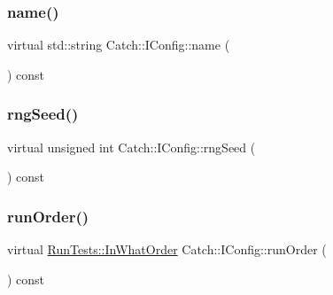 \mbox{\label{struct_catch_1_1_i_config_aa2315800a05c19db71518b1edc39d43b}} 
\subsubsection{\texorpdfstring{name()}{name()}}
{\footnotesize\ttfamily virtual std\+::string Catch\+::\+I\+Config\+::name (\begin{DoxyParamCaption}{ }\end{DoxyParamCaption}) const\hspace{0.3cm}{\ttfamily [pure virtual]}}

\mbox{\label{struct_catch_1_1_i_config_ae049eb45979d841073fa65d1094c7f14}} 
\subsubsection{\texorpdfstring{rng\+Seed()}{rngSeed()}}
{\footnotesize\ttfamily virtual unsigned int Catch\+::\+I\+Config\+::rng\+Seed (\begin{DoxyParamCaption}{ }\end{DoxyParamCaption}) const\hspace{0.3cm}{\ttfamily [pure virtual]}}

\mbox{\label{struct_catch_1_1_i_config_a0fc59c9aba1d4018538d5526daa5eb78}} 
\subsubsection{\texorpdfstring{run\+Order()}{runOrder()}}
{\footnotesize\ttfamily virtual \mbox{\hyperlink{struct_catch_1_1_run_tests_ab56bd851b1dd085869992d1a9d73dc5d}{Run\+Tests\+::\+In\+What\+Order}} Catch\+::\+I\+Config\+::run\+Order (\begin{DoxyParamCaption}{ }\end{DoxyParamCaption}) const\hspace{0.3cm}{\ttfamily [pure virtual]}}

